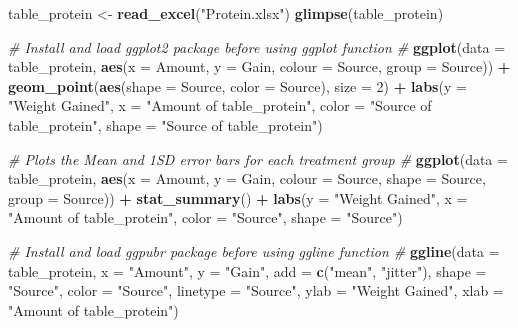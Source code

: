 \documentclass[11pt,]{article}
\newenvironment{Shaded}{\begin{snugshade}}{\end{snugshade}}
\newcommand{\CommentTok}[1]{\textcolor[rgb]{0.56,0.35,0.01}{\textit{#1}}}
\newcommand{\DataTypeTok}[1]{\textcolor[rgb]{0.13,0.29,0.53}{#1}}
\newcommand{\DecValTok}[1]{\textcolor[rgb]{0.00,0.00,0.81}{#1}}
\newcommand{\KeywordTok}[1]{\textcolor[rgb]{0.13,0.29,0.53}{\textbf{#1}}}
\newcommand{\NormalTok}[1]{#1}
\newcommand{\OperatorTok}[1]{\textcolor[rgb]{0.81,0.36,0.00}{\textbf{#1}}}
\newcommand{\StringTok}[1]{\textcolor[rgb]{0.31,0.60,0.02}{#1}}
\begin{document}
\begin{Shaded}
\begin{Highlighting}[]
\NormalTok{table_protein <-}\StringTok{ }\KeywordTok{read_excel}\NormalTok{(}\StringTok{"Protein.xlsx"}\NormalTok{)}
\KeywordTok{glimpse}\NormalTok{(table_protein)}

\CommentTok{# Install and load ggplot2 package before using ggplot function #}
\KeywordTok{ggplot}\NormalTok{(}\DataTypeTok{data =}\NormalTok{ table_protein, }\KeywordTok{aes}\NormalTok{(}\DataTypeTok{x =}\NormalTok{ Amount, }\DataTypeTok{y =}\NormalTok{ Gain, }\DataTypeTok{colour =}\NormalTok{ Source, }\DataTypeTok{group =}\NormalTok{ Source)) }\OperatorTok{+}\StringTok{ }
\StringTok{    }\KeywordTok{geom_point}\NormalTok{(}\KeywordTok{aes}\NormalTok{(}\DataTypeTok{shape =}\NormalTok{ Source, }\DataTypeTok{color =}\NormalTok{ Source), }\DataTypeTok{size =} \DecValTok{2}\NormalTok{) }\OperatorTok{+}\StringTok{ }\KeywordTok{labs}\NormalTok{(}\DataTypeTok{y =} \StringTok{"Weight Gained"}\NormalTok{, }
    \DataTypeTok{x =} \StringTok{"Amount of table_protein"}\NormalTok{, }\DataTypeTok{color =} \StringTok{"Source of table_protein"}\NormalTok{, }\DataTypeTok{shape =} \StringTok{"Source of table_protein"}\NormalTok{)}

\CommentTok{# Plots the Mean and 1SD error bars for each treatment group #}
\KeywordTok{ggplot}\NormalTok{(}\DataTypeTok{data =}\NormalTok{ table_protein, }\KeywordTok{aes}\NormalTok{(}\DataTypeTok{x =}\NormalTok{ Amount, }\DataTypeTok{y =}\NormalTok{ Gain, }\DataTypeTok{colour =}\NormalTok{ Source, }\DataTypeTok{shape =}\NormalTok{ Source, }
    \DataTypeTok{group =}\NormalTok{ Source)) }\OperatorTok{+}\StringTok{ }\KeywordTok{stat_summary}\NormalTok{() }\OperatorTok{+}\StringTok{ }\KeywordTok{labs}\NormalTok{(}\DataTypeTok{y =} \StringTok{"Weight Gained"}\NormalTok{, }\DataTypeTok{x =} \StringTok{"Amount of table_protein"}\NormalTok{, }
    \DataTypeTok{color =} \StringTok{"Source"}\NormalTok{, }\DataTypeTok{shape =} \StringTok{"Source"}\NormalTok{)}

\CommentTok{# Install and load ggpubr package before using ggline function #}
\KeywordTok{ggline}\NormalTok{(}\DataTypeTok{data =}\NormalTok{ table_protein, }\DataTypeTok{x =} \StringTok{"Amount"}\NormalTok{, }\DataTypeTok{y =} \StringTok{"Gain"}\NormalTok{, }\DataTypeTok{add =} \KeywordTok{c}\NormalTok{(}\StringTok{"mean"}\NormalTok{, }\StringTok{"jitter"}\NormalTok{), }
    \DataTypeTok{shape =} \StringTok{"Source"}\NormalTok{, }\DataTypeTok{color =} \StringTok{"Source"}\NormalTok{, }\DataTypeTok{linetype =} \StringTok{"Source"}\NormalTok{, }\DataTypeTok{ylab =} \StringTok{"Weight Gained"}\NormalTok{, }
    \DataTypeTok{xlab =} \StringTok{"Amount of table_protein"}\NormalTok{)}


\end{Highlighting}
\end{Shaded}
\end{document}
